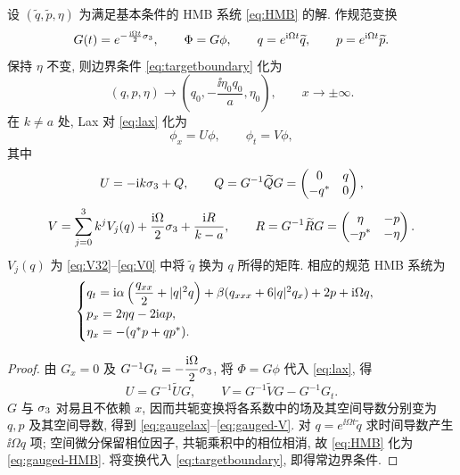 \begin{proposition}\label{prop:gauge}
设 $(\widetilde q,\widetilde p,\eta)$ 为满足基本条件的 HMB 系统 \eqref{eq:HMB} 的解. 作规范变换
\begin{equation}\label{eq:gauge}
G(t)=e^{-\frac{\mathrm{i}\Omega t}{2}\sigma_3},\qquad
\Phi=G\phi,\qquad q=e^{\mathrm{i}\Omega t}\widetilde q,\qquad
p=e^{\mathrm{i}\Omega t}\widetilde p.
\end{equation}
保持 $\eta$ 不变, 则边界条件 \eqref{eq:targetboundary} 化为
\begin{equation*}
(q,p,\eta)\longrightarrow
\left(q_0,-\dfrac{\ii\eta_0q_0}{a},\eta_0\right),\qquad x\to\pm\infty.
\end{equation*}
在 $k\ne a$ 处, Lax 对 \eqref{eq:lax} 化为
\begin{equation}\label{eq:gaugelax}
\phi_x=U\phi,\qquad \phi_t=V\phi,
\end{equation}
其中
\begin{equation}\label{eq:gauged-U}
U=-\mathrm{i} k\sigma_3+Q,\qquad
Q=G^{-1}\widetilde QG=\begin{pmatrix}0&q\\-{q}^{*}&0\end{pmatrix},
\end{equation}
\begin{equation}\label{eq:gauged-V}
V=\sum\limits_{j=0}^{3}k^jV_j(q)+\dfrac{\mathrm{i}\Omega}{2}\sigma_3+\dfrac{\mathrm{i} R}{k-a},\qquad
R=G^{-1}\widetilde RG=\begin{pmatrix}\eta&-p\\-{p}^{*}&-\eta\end{pmatrix}.
\end{equation}
$V_j(q)$ 为 \eqref{eq:V32}--\eqref{eq:V0} 中将 $\widetilde q$ 换为 $q$ 所得的矩阵.
相应的规范 HMB 系统为
\begin{equation}\label{eq:gauged-HMB}
\begin{cases}
q_t=\mathrm{i}\alpha\left(\dfrac{q_{xx}}{2}+|q|^2q\right)
+\beta(q_{xxx}+6|q|^2q_x)+2p+\mathrm{i}\Omega q,\\
p_x=2\eta q-2\mathrm{i} ap,\\
\eta_x=-({q}^{*}p+q{p}^{*}).
\end{cases}
\end{equation}
\end{proposition}
\begin{proof}
由 $G_x=0$ 及 $G^{-1}G_t=-\dfrac{\mathrm{i}\Omega}{2}\sigma_3$, 将 $\Phi=G\phi$ 代入 \eqref{eq:lax}, 得
\begin{equation*}
U=G^{-1}\widetilde UG,\qquad
V=G^{-1}\widetilde VG-G^{-1}G_t.
\end{equation*}
$G$ 与 $\sigma_3$ 对易且不依赖 $x$, 因而共轭变换将各系数中的场及其空间导数分别变为 $q,p$ 及其空间导数, 得到 \eqref{eq:gaugelax}--\eqref{eq:gauged-V}.
对 $q=e^{\ii\Omega t}\widetilde q$ 求时间导数产生 $\ii\Omega q$ 项;
空间微分保留相位因子, 共轭乘积中的相位相消, 故 \eqref{eq:HMB} 化为 \eqref{eq:gauged-HMB}.
将变换代入 \eqref{eq:targetboundary}, 即得常边界条件.
\end{proof}

